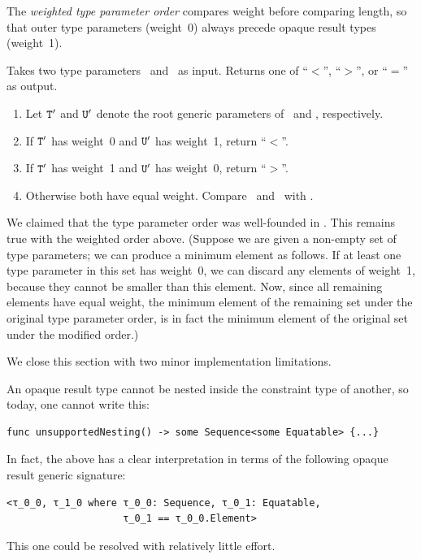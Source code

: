 \documentclass[../generics]{subfiles}
\begin{document}
The \emph{weighted type parameter order} compares weight before comparing length, so that outer type parameters (weight~0) always precede opaque result types (weight~1).

\begin{algorithm}
Takes two type parameters \tT\ and \tU\ as input. Returns one of ``$<$'', ``$>$'', or ``$=$'' as output.
\begin{enumerate}
\item Let $\texttt{T}'$ and $\texttt{U}'$ denote the root generic parameters of \tT\ and \tU, respectively.
\item If $\texttt{T}'$ has weight~0 and $\texttt{U}'$ has weight~1, return ``$<$''.
\item If $\texttt{T}'$ has weight~1 and $\texttt{U}'$ has weight~0, return ``$>$''.
\item Otherwise both have equal weight. Compare \tT\ and \tU\ with .
\end{enumerate}
\end{algorithm}

We claimed that the type parameter order was well-founded in . This remains true with the weighted order above. (Suppose we are given a non-empty set of type parameters; we can produce a minimum element as follows. If at least one type parameter in this set has weight~0, we can discard any elements of weight~1, because they cannot be smaller than this element. Now, since all remaining elements have equal weight, the minimum element of the remaining set under the original type parameter order, is in fact the minimum element of the original set under the modified order.)

\smallskip

We close this section with two minor implementation limitations.

\begin{example}
An opaque result type cannot be nested inside the constraint type of another, so today, one cannot write this:
\begin{Verbatim}
func unsupportedNesting() -> some Sequence<some Equatable> {...}
\end{Verbatim}

In fact, the above has a clear interpretation in terms of the following opaque result generic signature:
\begin{verbatim}
<τ_0_0, τ_1_0 where τ_0_0: Sequence, τ_0_1: Equatable,
                    τ_0_1 == τ_0_0.Element>
\end{verbatim}
This one could be resolved with relatively little effort.
\end{example}
\end{document}
